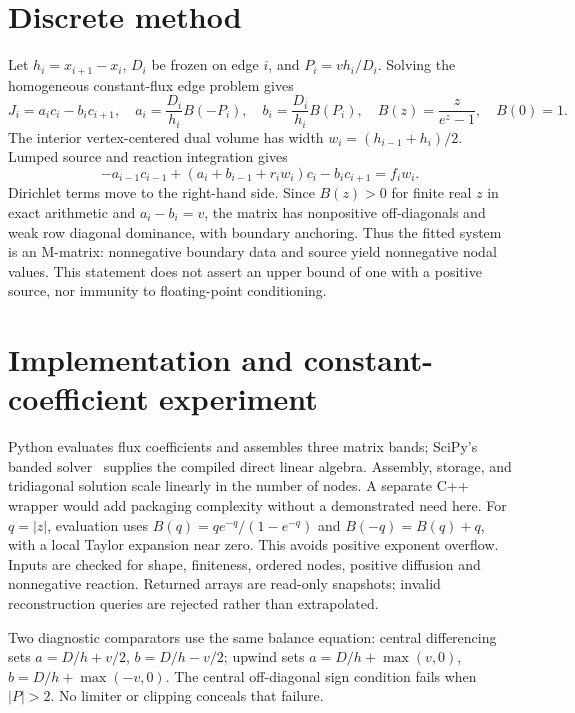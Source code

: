 \documentclass[11pt,a4paper]{article}
\begin{document}
\section{Discrete method}
Let $h_i=x_{i+1}-x_i$, $D_i$ be frozen on edge $i$, and
$P_i=vh_i/D_i$. Solving the homogeneous constant-flux edge problem gives
\begin{equation}
 J_i=a_i c_i-b_i c_{i+1},\quad
 a_i=\frac{D_i}{h_i}B(-P_i),\quad b_i=\frac{D_i}{h_i}B(P_i),\quad
 B(z)=\frac{z}{e^z-1},\quad B(0)=1. \label{eq:flux}
\end{equation}
The interior vertex-centered dual volume has width
$w_i=(h_{i-1}+h_i)/2$. Lumped source and reaction integration gives
\begin{equation}
 -a_{i-1}c_{i-1}+(a_i+b_{i-1}+r_iw_i)c_i-b_ic_{i+1}=f_iw_i.
 \label{eq:balance}
\end{equation}
Dirichlet terms move to the right-hand side. Since $B(z)>0$ for finite real $z$
in exact arithmetic and $a_i-b_i=v$, the matrix has nonpositive off-diagonals
and weak row diagonal dominance, with boundary anchoring. Thus the fitted
system is an M-matrix: nonnegative boundary data and source yield nonnegative
nodal values. This statement does not assert an upper bound of one with a
positive source, nor immunity to floating-point conditioning.

\newpage
\section{Implementation and constant-coefficient experiment}
Python evaluates flux coefficients and assembles three matrix bands; SciPy's
banded solver~\cite{scipy} supplies the compiled direct linear algebra. Assembly,
storage, and tridiagonal solution scale linearly in the number of nodes. A separate
C++ wrapper would add packaging complexity without a demonstrated need here.
For $q=|z|$, evaluation uses $B(q)=q e^{-q}/(1-e^{-q})$ and
$B(-q)=B(q)+q$, with a local Taylor expansion near zero. This avoids positive
exponent overflow. Inputs are checked for shape, finiteness, ordered nodes,
positive diffusion and nonnegative reaction. Returned arrays are read-only
snapshots; invalid reconstruction queries are rejected rather than extrapolated.

Two diagnostic comparators use the same balance equation: central differencing
sets $a=D/h+v/2$, $b=D/h-v/2$; upwind sets
$a=D/h+\max(v,0)$, $b=D/h+\max(-v,0)$. The central off-diagonal sign condition
fails when $|P|>2$. No limiter or clipping conceals that failure.
\end{document}
